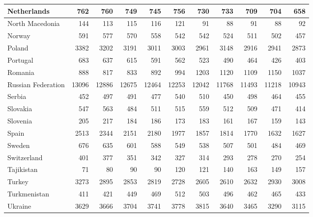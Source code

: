 \begin{table}
\begin{tabular}{|l|r|r|r|r|r|r|r|r|r|r|}
                   Netherlands&    762&    760&    749&    745&    756&    730&    733&    709&    704&    658\\\hline
               North Macedonia&    144&    113&    115&    116&    121&     91&     88&     91&     88&     92\\\hline
                        Norway&    591&    577&    570&    558&    542&    542&    524&    511&    502&    457\\\hline
                        Poland&   3382&   3202&   3191&   3011&   3003&   2961&   3148&   2916&   2941&   2873\\\hline
                      Portugal&    683&    637&    615&    591&    562&    523&    490&    464&    426&    403\\\hline
                       Romania&    888&    817&    833&    892&    994&   1203&   1120&   1109&   1150&   1037\\\hline
            Russian Federation&  13096&  12886&  12675&  12464&  12253&  12042&  11768&  11493&  11218&  10943\\\hline
                        Serbia&    452&    497&    491&    477&    540&    510&    450&    498&    464&    455\\\hline
                      Slovakia&    547&    563&    484&    511&    515&    559&    512&    509&    471&    414\\\hline
                      Slovenia&    205&    217&    184&    186&    173&    183&    161&    167&    159&    143\\\hline
                         Spain&   2513&   2344&   2151&   2180&   1977&   1857&   1814&   1770&   1632&   1627\\\hline
                        Sweden&    676&    635&    601&    588&    549&    538&    507&    501&    484&    469\\\hline
                   Switzerland&    401&    377&    351&    342&    327&    314&    293&    278&    270&    254\\\hline
                    Tajikistan&     71&     80&     90&     90&    120&    121&    140&    163&    149&    157\\\hline
                        Turkey&   3273&   2895&   2853&   2819&   2728&   2605&   2610&   2632&   2930&   3008\\\hline
                  Turkmenistan&    411&    421&    449&    469&    512&    503&    496&    462&    465&    433\\\hline
                       Ukraine&   3629&   3666&   3704&   3741&   3778&   3815&   3640&   3465&   3290&   3115\\\hline

\end{tabular}
\end{table}
